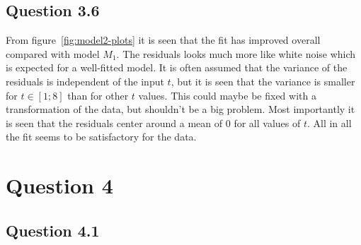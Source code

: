 \subsection*{Question 3.6}
From figure~\ref{fig:model2-plots} it is seen that the fit has improved overall compared with model $M_1$. The residuals looks much more like white noise which is expected for a well-fitted model. It is often assumed that the variance of the residuals is independent of the input $t$, but it is seen that the variance is smaller for $t\in[1;8]$ than for other $t$ values. This could maybe be fixed with a transformation of the data, but shouldn't be a big problem. Most importantly it is seen that the residuals center around a mean of 0 for all values of $t$. All in all the fit seems to be satisfactory for the data.

\section*{Question 4}

\subsection*{Question 4.1}


